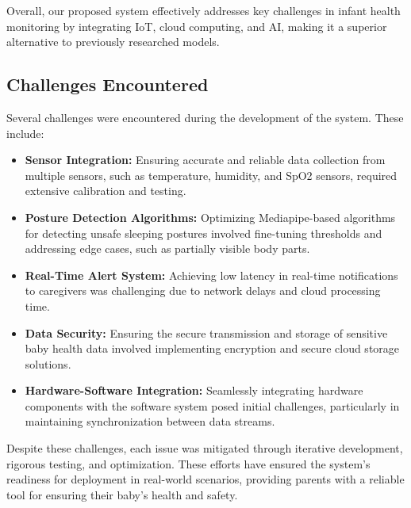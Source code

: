 \documentclass[conference]{IEEEtran}
\begin{document}
Overall, our proposed system effectively addresses key challenges in infant health monitoring by integrating IoT, cloud computing, and AI, making it a superior alternative to previously researched models.



\subsection{Challenges Encountered}
Several challenges were encountered during the development of the system. These include:

\begin{itemize}
    \item \textbf{Sensor Integration:} Ensuring accurate and reliable data collection from multiple sensors, such as temperature, humidity, and SpO2 sensors, required extensive calibration and testing.
    \item \textbf{Posture Detection Algorithms:} Optimizing Mediapipe-based algorithms for detecting unsafe sleeping postures involved fine-tuning thresholds and addressing edge cases, such as partially visible body parts.
    \item \textbf{Real-Time Alert System:} Achieving low latency in real-time notifications to caregivers was challenging due to network delays and cloud processing time.
    \item \textbf{Data Security:} Ensuring the secure transmission and storage of sensitive baby health data involved implementing encryption and secure cloud storage solutions.
    \item \textbf{Hardware-Software Integration:} Seamlessly integrating hardware components with the software system posed initial challenges, particularly in maintaining synchronization between data streams.
\end{itemize}

Despite these challenges, each issue was mitigated through iterative development, rigorous testing, and optimization. These efforts have ensured the system's readiness for deployment in real-world scenarios, providing parents with a reliable tool for ensuring their baby's health and safety.
\end{document}
